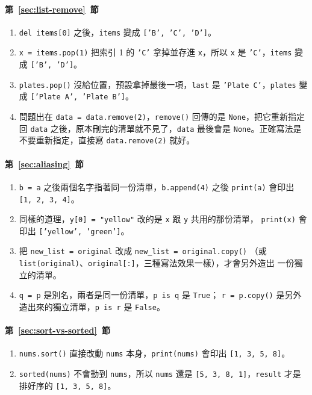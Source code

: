 \paragraph{第~\ref{sec:list-remove}~節}
\begin{enumerate}
\item \texttt{del items[0]} 之後，\texttt{items} 變成 \texttt{['B', 'C', 'D']}。
\item \texttt{x = items.pop(1)} 把索引 1 的 \texttt{'C'} 拿掉並存進 \texttt{x}，所以
\texttt{x} 是 \texttt{'C'}，\texttt{items} 變成 \texttt{['B', 'D']}。
\item \texttt{plates.pop()} 沒給位置，預設拿掉最後一項，\texttt{last} 是
\texttt{'Plate C'}，\texttt{plates} 變成 \texttt{['Plate A', 'Plate B']}。
\item 問題出在 \texttt{data = data.remove(2)}，\texttt{remove()} 回傳的是
\texttt{None}，把它重新指定回 \texttt{data} 之後，原本刪完的清單就不見了，\texttt{data}
最後會是 \texttt{None}。正確寫法是不要重新指定，直接寫 \texttt{data.remove(2)} 就好。
\end{enumerate}

\paragraph{第~\ref{sec:aliasing}~節}
\begin{enumerate}
\item \texttt{b = a} 之後兩個名字指著同一份清單，\texttt{b.append(4)} 之後
\texttt{print(a)} 會印出 \texttt{[1, 2, 3, 4]}。
\item 同樣的道理，\texttt{y[0] = "yellow"} 改的是 \texttt{x} 跟 \texttt{y} 共用的那份清單，
\texttt{print(x)} 會印出 \texttt{['yellow', 'green']}。
\item 把 \texttt{new\_list = original} 改成 \texttt{new\_list = original.copy()}
（或 \texttt{list(original)}、\texttt{original[:]}，三種寫法效果一樣），才會另外造出
一份獨立的清單。
\item \texttt{q = p} 是別名，兩者是同一份清單，\texttt{p is q} 是 \texttt{True}；
\texttt{r = p.copy()} 是另外造出來的獨立清單，\texttt{p is r} 是 \texttt{False}。
\end{enumerate}

\paragraph{第~\ref{sec:sort-vs-sorted}~節}
\begin{enumerate}
\item \texttt{nums.sort()} 直接改動 \texttt{nums} 本身，\texttt{print(nums)} 會印出
\texttt{[1, 3, 5, 8]}。
\item \texttt{sorted(nums)} 不會動到 \texttt{nums}，所以 \texttt{nums} 還是
\texttt{[5, 3, 8, 1]}，\texttt{result} 才是排好序的 \texttt{[1, 3, 5, 8]}。
\end{enumerate}

